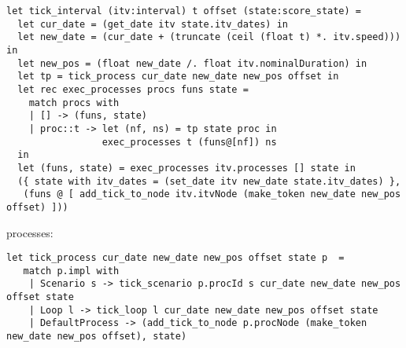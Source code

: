 \documentclass[applsci,article,submit,moreauthors,pdftex,10pt,a4paper]{mdpi}
\begin{document}
\begin{lstlisting}
let tick_interval (itv:interval) t offset (state:score_state) =
  let cur_date = (get_date itv state.itv_dates) in
  let new_date = (cur_date + (truncate (ceil (float t) *. itv.speed))) in
  let new_pos = (float new_date /. float itv.nominalDuration) in
  let tp = tick_process cur_date new_date new_pos offset in
  let rec exec_processes procs funs state =
    match procs with
    | [] -> (funs, state)
    | proc::t -> let (nf, ns) = tp state proc in
                 exec_processes t (funs@[nf]) ns
  in
  let (funs, state) = exec_processes itv.processes [] state in
  ({ state with itv_dates = (set_date itv new_date state.itv_dates) },
   (funs @ [ add_tick_to_node itv.itvNode (make_token new_date new_pos offset) ]))

\end{lstlisting}

processes:
\begin{lstlisting}
let tick_process cur_date new_date new_pos offset state p  =
   match p.impl with
    | Scenario s -> tick_scenario p.procId s cur_date new_date new_pos offset state
    | Loop l -> tick_loop l cur_date new_date new_pos offset state
    | DefaultProcess -> (add_tick_to_node p.procNode (make_token new_date new_pos offset), state)

\end{lstlisting}
\end{document}
